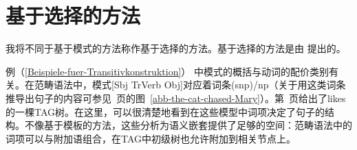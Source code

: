 \section{基于选择的方法}
\label{Abschnitt-Selektionsbasierter-Spracherwerb}

我将不同于基于模式的方法称作基于选择的方法。基于选择的方法是由 \citet{Green-Grammar-Growth}提出的。

例（\ref{Beispiele-fuer-Transitivkonstruktion}） 中模式的概括与动词的配价类别有关。在范畴语法中，模式[Sbj TrVerb Obj]对应着词条(s\bs np)/np（关于用这类词条推导出句子的内容可参见~\pageref{abb-the-cat-chased-Mary}页的图~\ref{abb-the-cat-chased-Mary}）。第~\pageref{Abbildung-Max-likes-Anouk}页给出了likes的一棵TAG树。在这里，可以很清楚地看到在这些模型中词项决定了句子的结构。不像基于模板的方法，这些分析为语义嵌套提供了足够的空间：范畴语法中的词项可以与附加语组合，在TAG中初级树也允许附加到相关节点上。

